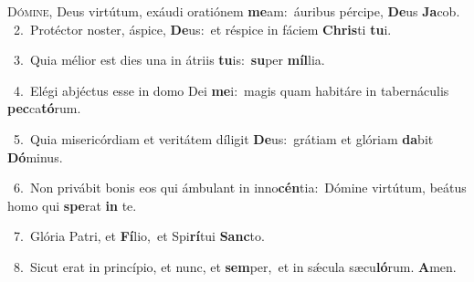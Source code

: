 \lettrine{\initial\textcolor{\initialcolor}{D}}{ómine,} Deus virtútum, exáudi oratiónem \textbf{me}\-am:~\star áuribus pércipe, \textbf{De}\-us \textbf{Ja}\-cob.\\
{\numbfont\textcolor{\numbcolor}{~2.}}~Protéctor noster, áspice, \textbf{De}\-us:~\star et réspice in fáciem \textbf{Chris}\-ti \textbf{tu}\-i.\par
{\numbfont\textcolor{\numbcolor}{~3.}}~Quia mélior est dies una in átriis \textbf{tu}\-is:~\star \textbf{su}\-per \textbf{míl}\-lia.\par
{\numbfont\textcolor{\numbcolor}{~4.}}~Elégi abjéctus esse in domo Dei \textbf{me}\-i:~\star magis quam habitáre in tabernáculis \textbf{pec}\-ca\-\textbf{tó}\-rum.\par
{\numbfont\textcolor{\numbcolor}{~5.}}~Quia misericórdiam et veritátem díligit \textbf{De}\-us:~\star grátiam et glóriam \textbf{da}\-bit \textbf{Dó}\-minus.\par
{\numbfont\textcolor{\numbcolor}{~6.}}~Non privábit bonis eos qui ámbulant in inno\-\textbf{cén}\-tia:~\star Dómine virtútum, beátus homo qui \textbf{spe}\-rat \textbf{in} te.\par
{\numbfont\textcolor{\numbcolor}{~7.}}~Glória Patri, et \textbf{Fí}\-lio,~\star et Spi\-\textbf{rí}\-tui \textbf{Sanc}\-to.\par
{\numbfont\textcolor{\numbcolor}{~8.}}~Sicut erat in princípio, et nunc, et \textbf{sem}\-per,~\star et in sǽcula sæcu\-\textbf{ló}\-rum. \textbf{A}\-men.\par
